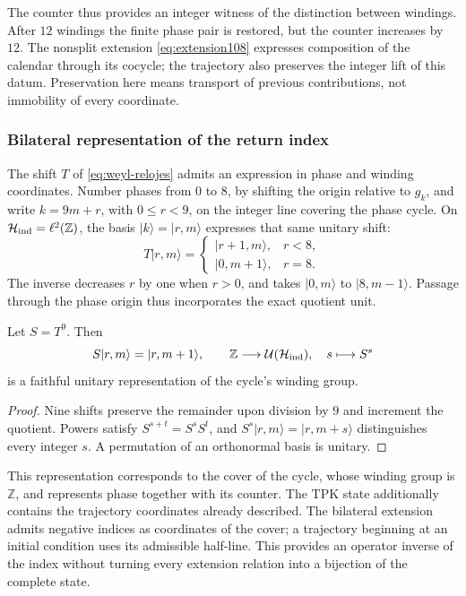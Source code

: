 The counter thus provides an integer witness of the distinction between
windings. After \(12\) windings the finite phase pair is restored, but
the counter increases by \(12\). The nonsplit extension
\eqref{eq:extension108} expresses composition of the calendar through its
cocycle; the trajectory also preserves the integer lift of this datum.
Preservation here means transport of previous contributions,
not immobility of every coordinate.

\subsubsection{Bilateral representation of the return index}

The shift \(T\) of \eqref{eq:weyl-relojes} admits an
expression in phase and winding coordinates. Number phases from \(0\) to
\(8\), by shifting the origin relative to \(g_k\), and
write \(k=9m+r\), with \(0\leq r<9\), on the integer line
covering the phase cycle. On
\(\mathcal H_{\rm ind}=\ell^2(\mathbb Z)\), the basis
\(|k\rangle=|r,m\rangle\) expresses that same unitary shift:
\[
 T|r,m\rangle=
 \begin{cases}
 |r+1,m\rangle,&r<8,\\
 |0,m+1\rangle,&r=8.
 \end{cases}
\]
The inverse decreases \(r\) by one when \(r>0\), and takes
\(|0,m\rangle\) to \(|8,m-1\rangle\). Passage through the phase origin
thus incorporates the exact quotient unit.

\begin{proposition}
\label{mono-ampl:representacion}
Let \(S=T^9\). Then
\[
 S|r,m\rangle=|r,m+1\rangle,\qquad
 \mathbb Z\longrightarrow\mathcal U(\mathcal H_{\rm ind}),
 \quad s\longmapsto S^s
\]
is a faithful unitary representation of the cycle's winding group.
\end{proposition}
\begin{proof}
Nine shifts preserve the remainder upon division by \(9\) and
increment the quotient. Powers satisfy
\(S^{s+t}=S^sS^t\), and \(S^s|r,m\rangle=|r,m+s\rangle\) distinguishes
every integer \(s\). A permutation of an orthonormal basis is unitary.
\end{proof}

This representation corresponds to the cover of the cycle, whose winding
group is \(\mathbb Z\), and represents phase together with its counter. The
TPK state additionally contains the trajectory coordinates already described.
The bilateral extension admits negative indices as coordinates of the
cover; a trajectory beginning at an initial condition uses
its admissible half-line. This provides an operator inverse
of the index without turning every extension relation into a bijection of the
complete state.

